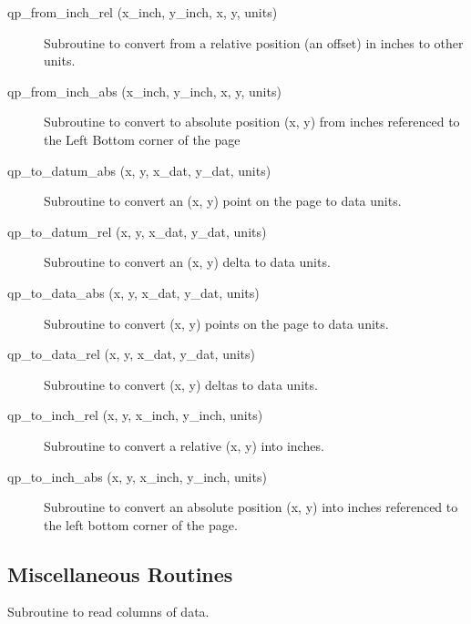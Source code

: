 \begin{description}

\item[qp\_from\_inch\_rel (x\_inch, y\_inch, x, y, units)] \Newline 
     Subroutine to convert from a relative position (an offset) in inches
     to other units.

\item[qp\_from\_inch\_abs (x\_inch, y\_inch, x, y, units)] \Newline 
     Subroutine to convert to absolute position (x, y) from inches referenced
     to the Left Bottom corner of the page

\item[qp\_to\_datum\_abs (x, y, x\_dat, y\_dat, units)] \Newline 
     Subroutine to convert an (x, y) point on the page to data units.

\item[qp\_to\_datum\_rel (x, y, x\_dat, y\_dat, units)] \Newline 
     Subroutine to convert an (x, y) delta to data units.

\item[qp\_to\_data\_abs (x, y, x\_dat, y\_dat, units)] \Newline 
     Subroutine to convert (x, y) points on the page to data units.

\item[qp\_to\_data\_rel (x, y, x\_dat, y\_dat, units)] \Newline 
     Subroutine to convert (x, y) deltas to data units.

\item[qp\_to\_inch\_rel (x, y, x\_inch, y\_inch, units)] \Newline 
     Subroutine to convert a relative (x, y) into inches.

\item[qp\_to\_inch\_abs (x, y, x\_inch, y\_inch, units)] \Newline 
     Subroutine to convert an absolute position (x, y) into inches referenced
     to the left bottom corner of the page.

\end{description}

\subsection{Miscellaneous Routines}

\begin{description}

\item[qp\_read\_data (iu, err\_flag, x, ix\_col, y, iy\_col, z, iz\_col, 
                                                               t, it\_col) ] \Newline 
     Subroutine to read columns of data.

\end{description}

